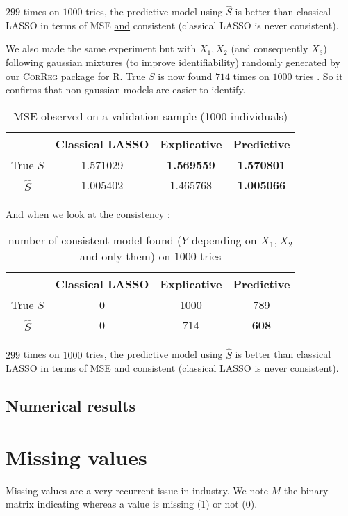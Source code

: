 \documentclass[11pt,a4paper]{report}
\begin{document}
		$299$ times on $1000$ tries, the predictive model using $\hat{S}$ is better than classical LASSO in terms of MSE \underline{and} consistent (classical LASSO is never consistent).
		
		We also made the same experiment but with $X_1,X_2$ (and consequently $X_3$) following gaussian mixtures (to improve identifiability) randomly generated by our \textsc{CorReg} package for R. 
		True $S$ is now found $714$ times on $1000$ tries \label{testidentifiable}. So it confirms that non-gaussian models are easier to identify.
		
		
		\begin{table}[h!]
		\centering
		\begin{tabular}{|c|c|c|c|}
		\hline 
		 & Classical LASSO & Explicative & Predictive \\ 
		\hline 
		True $S$ &  1.571029 & \textbf{1.569559} & \textbf{1.570801} \\ 
		\hline 
		$\hat{S}$ & 1.005402 & 1.465768 & \textbf{1.005066} \\ 
		\hline 
		\end{tabular} 
		\caption{MSE observed on a validation sample (1000 individuals)}
		\end{table}

		And when we look at the consistency :
		\begin{table}[h!]
		\centering	
		\begin{tabular}{|c|c|c|c|}
		\hline 
		 & Classical LASSO & Explicative & Predictive \\ 
		\hline 
		True $S$ &  0 & 1000 & 789 \\ 
		\hline 
		$\hat{S}$ & 0 & 714 & \textbf{608} \\ 
		\hline 
		\end{tabular} 
		\caption{number of consistent model found ($Y$ depending on $X_1,X_2$ and only them) on $1000$ tries}
		\end{table}				
				
		
		$299$ times on $1000$ tries, the predictive model using $\hat{S}$ is better than classical LASSO in terms of MSE \underline{and} consistent (classical LASSO is never consistent).
		

	\section{Numerical results}

\chapter{Missing values}
	Missing values are a very recurrent issue in industry. We note $M$ the binary matrix indicating whereas a value is missing (1) or not (0).
\end{document}
